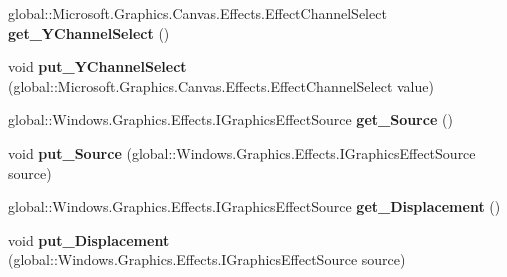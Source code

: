 \begin{DoxyCompactItemize}
global\+::\+Microsoft.\+Graphics.\+Canvas.\+Effects.\+Effect\+Channel\+Select {\bfseries get\+\_\+\+Y\+Channel\+Select} ()
\item 
\mbox{\label{interface_microsoft_1_1_graphics_1_1_canvas_1_1_effects_1_1_i_displacement_map_effect_a21fd084ca58eb6bb042e123fb75cf549}} 
void {\bfseries put\+\_\+\+Y\+Channel\+Select} (global\+::\+Microsoft.\+Graphics.\+Canvas.\+Effects.\+Effect\+Channel\+Select value)
\item 
\mbox{\label{interface_microsoft_1_1_graphics_1_1_canvas_1_1_effects_1_1_i_displacement_map_effect_a3ae94b5f7ba6e9a6577d1f8e64818dde}} 
global\+::\+Windows.\+Graphics.\+Effects.\+I\+Graphics\+Effect\+Source {\bfseries get\+\_\+\+Source} ()
\item 
\mbox{\label{interface_microsoft_1_1_graphics_1_1_canvas_1_1_effects_1_1_i_displacement_map_effect_a7510937c3744875c4cbbb6cb41254bd2}} 
void {\bfseries put\+\_\+\+Source} (global\+::\+Windows.\+Graphics.\+Effects.\+I\+Graphics\+Effect\+Source source)
\item 
\mbox{\label{interface_microsoft_1_1_graphics_1_1_canvas_1_1_effects_1_1_i_displacement_map_effect_ac59cc7dd5374f30d71b753983dba806d}} 
global\+::\+Windows.\+Graphics.\+Effects.\+I\+Graphics\+Effect\+Source {\bfseries get\+\_\+\+Displacement} ()
\item 
\mbox{\label{interface_microsoft_1_1_graphics_1_1_canvas_1_1_effects_1_1_i_displacement_map_effect_a2d5970972f40598f146c9ef349c15471}} 
void {\bfseries put\+\_\+\+Displacement} (global\+::\+Windows.\+Graphics.\+Effects.\+I\+Graphics\+Effect\+Source source)
\item 
\mbox{\label{interface_microsoft_1_1_graphics_1_1_canvas_1_1_effects_1_1_i_displacement_map_effect_a7aebbe3771b9e29fcf061b4a886e6364}} 

\end{DoxyCompactItemize}
